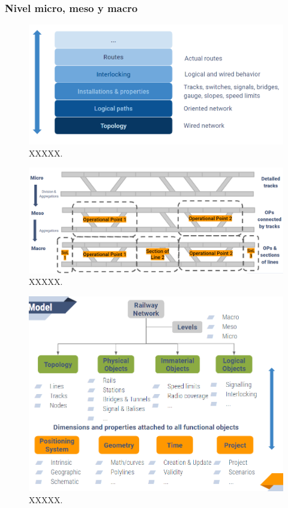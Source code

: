 \subsubsection{Nivel micro, meso y macro}

    \lipsum[1]

    \begin{figure}[!h]
        \centering
        \includegraphics[width=1\textwidth]{Figuras/capas}
        \centering\caption{XXXXX.}
        \label{fig:RTM_1}
    \end{figure}
    
    \lipsum[1]

    \begin{figure}[!h]
        \centering
        \includegraphics[width=1\textwidth]{Figuras/railtopomodel}
        \centering\caption{XXXXX.}
        \label{fig:RTM_2}
    \end{figure}

    \lipsum[1]

        \begin{figure}[!h]
        \centering
        \includegraphics[width=1\textwidth]{Figuras/objetos}
        \centering\caption{XXXXX.}
        \label{fig:RTM_3}
    \end{figure}
    
    \lipsum[1]